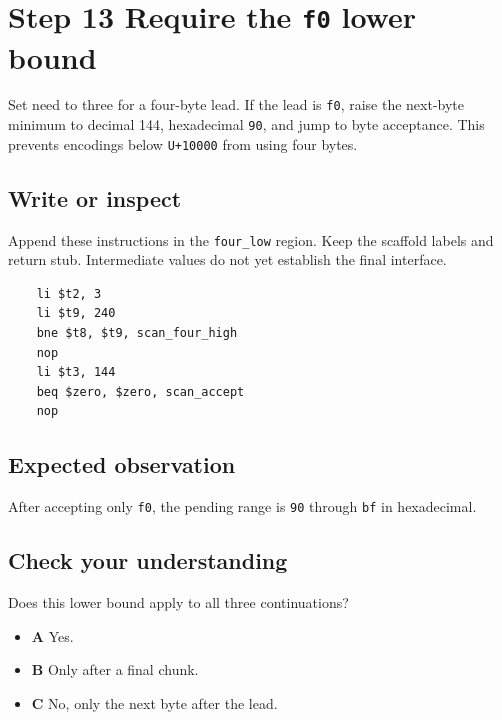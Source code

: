 \section{Step 13 Require the \texttt{f0} lower bound}\label{utf8-s13}

Set need to three for a four-byte lead. If the lead is \texttt{f0}, raise the next-byte minimum to decimal 144, hexadecimal \texttt{90}, and jump to byte acceptance. This prevents encodings below \texttt{U+10000} from using four bytes.

\subsection{Write or inspect}
Append these instructions in the \texttt{four\_low} region. Keep the scaffold labels and return stub. Intermediate values do not yet establish the final interface.

\begin{verbatim}
    li $t2, 3
    li $t9, 240
    bne $t8, $t9, scan_four_high
    nop
    li $t3, 144
    beq $zero, $zero, scan_accept
    nop
\end{verbatim}

\subsection{Expected observation}
After accepting only \texttt{f0}, the pending range is \texttt{90} through \texttt{bf} in hexadecimal.

\subsection{Check your understanding}
Does this lower bound apply to all three continuations?

\begin{itemize}
  \item \textbf{A} Yes.
  \item \textbf{B} Only after a final chunk.
  \item \textbf{C} No, only the next byte after the lead.
\end{itemize}
